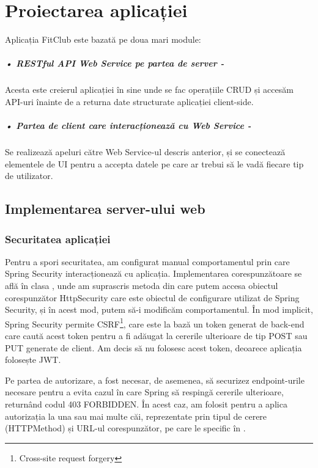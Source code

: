 \chapter{Proiectarea aplicației}
Aplicația FitClub este bazată pe doua mari module:

\paragraph{•  RESTful API Web Service pe partea de server -}Acesta este creierul aplicației în sine unde se fac operațiile CRUD și accesăm API-uri înainte de a returna date structurate aplicației client-side.

\paragraph{•  Partea de client care interacționează cu Web Service -}Se realizează apeluri către Web Service-ul descris anterior, și se conectează elementele de UI pentru a accepta datele pe care ar trebui să le vadă fiecare tip de utilizator.\newline

\section{Implementarea server-ului web}

\subsection{Securitatea aplicației}
\lstset{frame=tb}

Pentru a spori securitatea, am configurat manual comportamentul prin care Spring Security interacționează cu aplicația. Implementarea corespunzătoare se află în clasa , unde am suprascris metoda  din care putem accesa obiectul corespunzător HttpSecurity care este obiectul de configurare utilizat de Spring Security, și în acest mod, putem să-i modificăm comportamentul. În mod implicit, Spring Security permite CSRF\footnote{Cross-site request forgery}, care este la bază un token generat de back-end care caută acest token pentru a fi adăugat la cererile ulterioare de tip POST sau PUT generate de client. Am decis să nu folosesc acest token, deoarece aplicația folosește JWT.\newline

Pe partea de autorizare, a fost necesar, de asemenea, să securizez endpoint-urile necesare pentru a evita cazul în care Spring să respingă cererile ulterioare, returnând codul 403 FORBIDDEN.\newline
În acest caz, am folosit  pentru a aplica autorizația la una sau mai multe căi, reprezentate prin tipul de cerere (HTTPMethod) și URL-ul corespunzător, pe care le specific în .\newline

